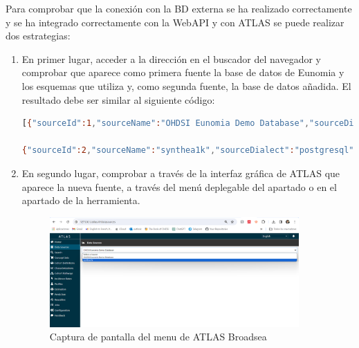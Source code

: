 Para comprobar que la conexión con la BD externa se ha realizado correctamente y se ha integrado correctamente con la WebAPI y con ATLAS se puede realizar dos estrategias:

\begin{enumerate}
    \item En primer lugar, acceder a la dirección  en el buscador del navegador y comprobar que aparece como primera fuente la base de datos de Eunomia y los esquemas que utiliza y, como segunda fuente, la base de datos añadida. El resultado debe ser similar al siguiente código:

\begin{lstlisting}[language=sh]
[{"sourceId":1,"sourceName":"OHDSI Eunomia Demo Database","sourceDialect":"postgresql","sourceKey":"EUNOMIA","daimons":[{"sourceDaimonId":1,"daimonType":"CDM","tableQualifier":"demo_cdm","priority":0},{"sourceDaimonId":3,"daimonType":"Results","tableQualifier":"demo_cdm_results","priority":0},{"sourceDaimonId":2,"daimonType":"Vocabulary","tableQualifier":"omop_vocab","priority":10}]},

{"sourceId":2,"sourceName":"synthea1k","sourceDialect":"postgresql","sourceKey":"SYNTHEA1K","daimons":[{"sourceDaimonId":4,"daimonType":"CDM","tableQualifier":"cdm\n","priority":1},{"sourceDaimonId":5,"daimonType":"Vocabulary","tableQualifier":"omop_vocab","priority":1},{"sourceDaimonId":6,"daimonType":"Results","tableQualifier":"cdm_results","priority":0}]}]
\end{lstlisting}

    \item En segundo lugar, comprobar a través de la interfaz gráfica de ATLAS que aparece la nueva fuente, a través del menú deplegable del apartado  o en el apartado  de la herramienta.

\begin{figure}[H]
    \centering
    \includegraphics[width=0.90\textwidth]{figures/showDataSources.png}
    \caption{Captura de pantalla del menu  de ATLAS Broadsea}
    \label{fig:showDataSources}
\end{figure}


\end{enumerate}
